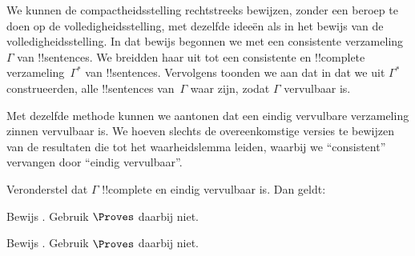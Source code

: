 \documentclass[../../../include/open-logic-section]{subfiles}
\begin{document}
      {}
      {}


We kunnen de compactheidsstelling rechtstreeks bewijzen, zonder een
beroep te doen op de volledigheidsstelling, met dezelfde ideeën als in
het bewijs van de volledigheidsstelling. In dat bewijs begonnen we met
een consistente verzameling~$\Gamma$ van !!{sentence}s. We breidden haar
uit tot een consistente en !!{complete}
verzameling~$\Gamma^*$ van !!{sentence}s. Vervolgens toonden we aan dat
in 
dat we uit $\Gamma^*$ construeerden, alle !!{sentence}s van~$\Gamma$ waar
zijn, zodat $\Gamma$ vervulbaar is.

Met dezelfde methode kunnen we aantonen dat een eindig vervulbare
verzameling zinnen vervulbaar is. We hoeven slechts de overeenkomstige
versies te bewijzen van de resultaten die tot het waarheidslemma leiden,
waarbij we ``consistent'' vervangen door ``eindig vervulbaar''.

\begin{prop}
Veronderstel dat $\Gamma$ !!{complete} en eindig vervulbaar is. Dan geldt:
\begin{enumerate}


\end{enumerate}
\end{prop}

\begin{prob}
Bewijs . Gebruik $\Proves$ daarbij niet.
\end{prob}
\tagendprob

\begin{prob}
Bewijs . Gebruik $\Proves$ daarbij niet.
\end{prob}
\tagendprob

\end{document}

